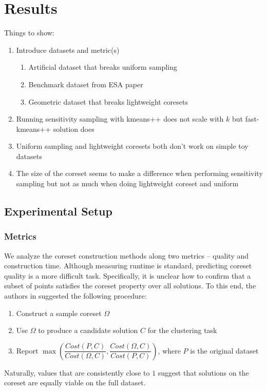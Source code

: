 \section{Results}
Things to show:
\begin{enumerate}
    \item Introduce datasets and metric(s)
    \begin{enumerate}
        \item Artificial dataset that breaks uniform sampling
        \item Benchmark dataset from ESA paper
        \item Geometric dataset that breaks lightweight coresets
    \end{enumerate}
    \item Running sensitivity sampling with kmeans++ does not scale with $k$ but fast-kmeans++ solution does
    \item Uniform sampling and lightweight coresets both don't work on simple toy datasets
    \item The size of the coreset seems to make a difference when performing sensitivity sampling but not as much
          when doing lightweight coreset and uniform
\end{enumerate}

\subsection{Experimental Setup}
\subsubsection{Metrics}

We analyze the coreset construction methods along two metrics -- quality and construction time.  Although measuring runtime is standard, predicting coreset
quality is a more difficult task. Specifically, it is unclear how to confirm that a subset of points satisfies the coreset property over all solutions. To this
end, the authors in \cite{chrisESA} suggested the following procedure:
\begin{enumerate}
    \item Construct a sample coreset $\Omega$
    \item Use $\Omega$ to produce a candidate solution $C$ for the clustering task
    \item Report $\max \left( \dfrac{Cost(P, C)}{Cost(\Omega, C)}, \dfrac{Cost(\Omega, C)}{Cost(P, C)} \right)$, where $P$ is the original dataset
\end{enumerate}
Naturally, values that are consistently close to $1$ suggest that solutions on the coreset are equally viable on the full dataset.

